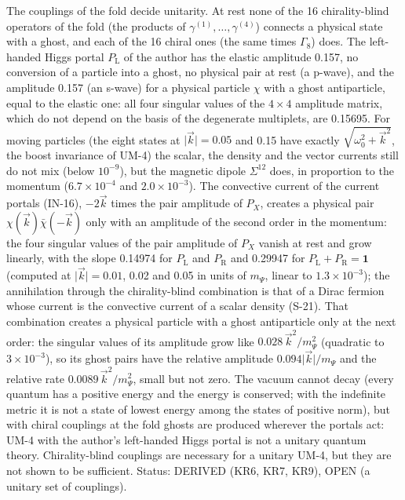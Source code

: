 \documentclass[
  10pt,
]{article}
\begin{document}
The couplings of the fold decide unitarity. At rest none of the 16
chirality-blind operators of the fold (the products of
\(\gamma^{(1)}, \dots, \gamma^{(4)}\)) connects a physical state with a
ghost, and each of the 16 chiral ones (the same times \(\Gamma_8\))
does. The left-handed Higgs portal \(P_{\mathrm{L}}\) of the author has
the elastic amplitude 0.157, no conversion of a particle into a ghost,
no physical pair at rest (a p-wave), and the amplitude 0.157 (an s-wave)
for a physical particle \(\chi\) with a ghost antiparticle, equal to the
elastic one: all four singular values of the \(4 \times 4\) amplitude
matrix, which do not depend on the basis of the degenerate multiplets,
are 0.15695. For moving particles (the eight states at
\(\lvert\vec k\rvert = 0.05\) and 0.15 have exactly
\(\sqrt{\omega_0^2 + \vec k^2}\), the boost invariance of UM-4) the
scalar, the density and the vector currents still do not mix (below
\(10^{-9}\)), but the magnetic dipole \(\Sigma^{12}\) does, in
proportion to the momentum (\(6.7\times10^{-4}\) and
\(2.0\times10^{-3}\)). The convective current of the current portals
(IN-16), \(-2\vec k\) times the pair amplitude of \(P_X\), creates a
physical pair \(\chi(\vec k)\bar\chi(-\vec k)\) only with an amplitude
of the second order in the momentum: the four singular values of the
pair amplitude of \(P_X\) vanish at rest and grow linearly, with the
slope 0.14974 for \(P_{\mathrm{L}}\) and \(P_{\mathrm{R}}\) and 0.29947
for \(P_{\mathrm{L}} + P_{\mathrm{R}} = \mathbf{1}\) (computed at
\(\lvert\vec k\rvert = 0.01\), 0.02 and 0.05 in units of \(m_\Psi\),
linear to \(1.3\times10^{-3}\)); the annihilation through the
chirality-blind combination is that of a Dirac fermion whose current is
the convective current of a scalar density (S-21). That combination
creates a physical particle with a ghost antiparticle only at the next
order: the singular values of its amplitude grow like
\(0.028\,\vec k^2/m_\Psi^2\) (quadratic to \(3\times10^{-3}\)), so its
ghost pairs have the relative amplitude
\(0.094\lvert\vec k\rvert/m_\Psi\) and the relative rate
\(0.0089\,\vec k^2/m_\Psi^2\), small but not zero. The vacuum cannot
decay (every quantum has a positive energy and the energy is conserved;
with the indefinite metric it is not a state of lowest energy among the
states of positive norm), but with chiral couplings at the fold ghosts
are produced wherever the portals act: UM-4 with the author's
left-handed Higgs portal is not a unitary quantum theory.
Chirality-blind couplings are necessary for a unitary UM-4, but they are
not shown to be sufficient. Status: DERIVED (KR6, KR7, KR9), OPEN (a
unitary set of couplings).
\end{document}
